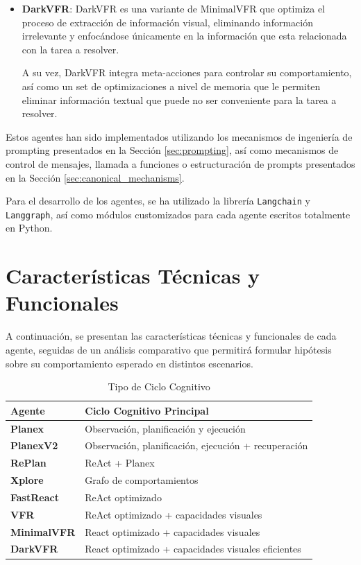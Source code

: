 \begin{itemize}
    Esta unificación del ciclo cognitivo permite reducir la complejidad y
    aumentar la flexibilidad del agente, facilitando el desarrollo de nuevas
    variantes y mejorando la adaptabilidad a distintos entornos.
    
    \item \textbf{DarkVFR}: DarkVFR es una variante de MinimalVFR que optimiza
    el proceso de extracción de información visual, eliminando información
    irrelevante y enfocándose únicamente en la información que esta relacionada
    con la tarea a resolver.

    A su vez, DarkVFR integra meta-acciones para controlar su comportamiento, así
    como un set de optimizaciones a nivel de memoria que le permiten eliminar
    información textual que puede no ser conveniente para la tarea a resolver.

\end{itemize}

Estos agentes han sido implementados utilizando los mecanismos de ingeniería de prompting
presentados en la Sección \ref{sec:prompting}, así como mecanismos de control de mensajes,
llamada a funciones o estructuración de prompts presentados en la Sección \ref{sec:canonical_mechanisms}.

Para el desarrollo de los agentes, se ha utilizado la librería \texttt{Langchain} y \texttt{Langgraph}, 
así como módulos customizados para cada agente escritos totalmente en Python.

\section{Características Técnicas y Funcionales}
A continuación, se presentan las características técnicas y funcionales de cada
agente, seguidas de un análisis comparativo que permitirá formular hipótesis
sobre su comportamiento esperado en distintos escenarios.


\begin{table}[!h]
\centering
\caption{Tipo de Ciclo Cognitivo}
\begin{tabular}{p{3.5cm} p{10cm}}
\toprule
\textbf{Agente} & \textbf{Ciclo Cognitivo Principal} \\
\midrule
\textbf{Planex} & Observación, planificación y ejecución \\
\textbf{PlanexV2} & Observación, planificación, ejecución + recuperación \\
\textbf{RePlan} & ReAct + Planex \\
\textbf{Xplore} & Grafo de comportamientos \\
\textbf{FastReact} & ReAct optimizado \\
\textbf{VFR} & ReAct optimizado + capacidades visuales \\
\textbf{MinimalVFR} & React optimizado + capacidades visuales \\
\textbf{DarkVFR} & React optimizado + capacidades visuales eficientes \\
\bottomrule
\end{tabular}
\end{table}


